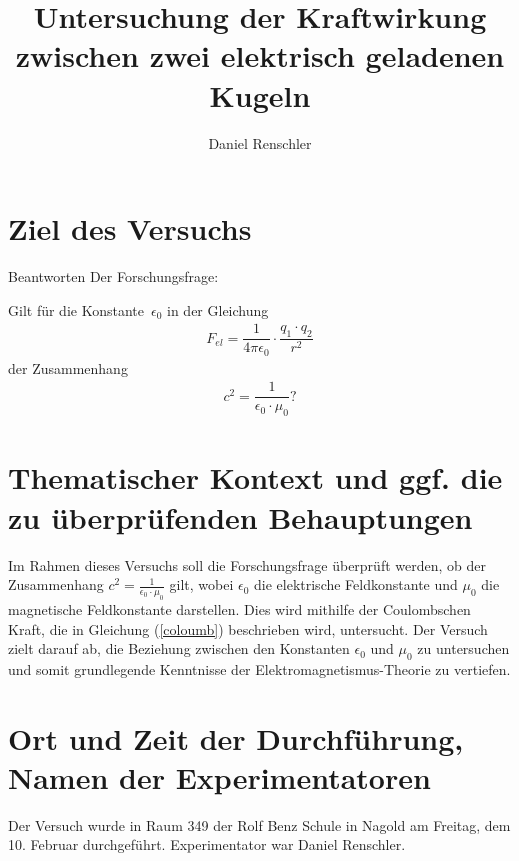 \documentclass[a4paper]{article}
\title{Untersuchung der Kraftwirkung zwischen zwei elektrisch geladenen Kugeln}
\author{Daniel Renschler}
\date{}
\begin{document}
\maketitle


\section{Ziel des Versuchs}
\label{ssub:Ziel des Versuchs}
Beantworten Der Forschungsfrage:


\begin{tcolorbox}[colback=black!5!white,colframe=black!75!black,title=Forschungsfrage]
  Gilt für die Konstante~$\epsilon_0$ in der Gleichung 
  \begin{align}
  F_{el} = \dfrac{1}{4\pi\epsilon_0} \cdot \dfrac{q_1 \cdot q_2}{r^2} \label{coloumb}
  \end{align}
  der Zusammenhang
  \begin{align}
  c^2 = \dfrac{1}{\epsilon_0 \cdot \mu_0} \text{?}\label{halt-c}
  \end{align}
\end{tcolorbox}

\section{Thematischer Kontext und ggf. die zu überprüfenden Behauptungen}
Im Rahmen dieses Versuchs soll die Forschungsfrage überprüft werden, ob der
Zusammenhang $c^2 = \frac{1}{\epsilon_0 \cdot \mu_0}$ gilt, wobei $\epsilon_0$
die elektrische Feldkonstante und $\mu_0$ die magnetische Feldkonstante
darstellen. Dies wird mithilfe der Coulombschen Kraft, die in Gleichung
(\ref{coloumb}) beschrieben wird, untersucht. Der Versuch zielt darauf ab, die
Beziehung zwischen den Konstanten $\epsilon_0$ und $\mu_0$ zu untersuchen und
somit grundlegende Kenntnisse der Elektromagnetismus-Theorie zu vertiefen.



\section{Ort und Zeit der Durchführung, Namen der Experimentatoren} %
\label{ssub:Ort und Zeit der Durchführung, Namen der Experimentatoren}
Der Versuch wurde in Raum 349 der Rolf Benz Schule in Nagold am Freitag, dem
10. Februar durchgeführt. Experimentator war Daniel Renschler.
\end{document}
